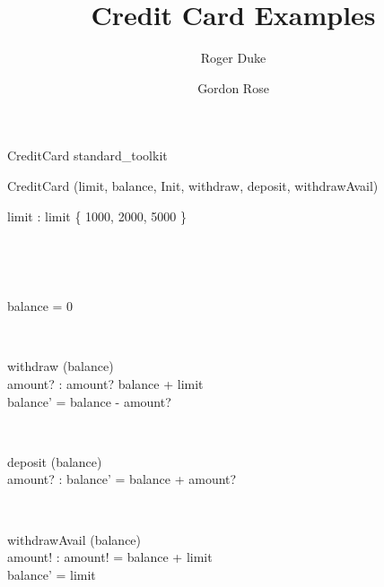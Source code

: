 


\title{Credit Card Examples}
\author{Roger Duke \and Gordon Rose}
\date{}
\maketitle

\begin{zsection}
  \SECTION CreditCard \parents standard\_toolkit
\end{zsection}

\begin{class}{CreditCard} 
\also
        \visibility (limit, balance, Init, withdraw, deposit, withdrawAvail) \\
        \begin{axdef}
		limit : \nat
	\where
		limit \in \{ 1000, 2000, 5000 \}
	\end{axdef}\\
	 \\
	\begin{init}
		balance = 0
	\end{init} \\
	\begin{op}{withdraw}
		\Delta (balance) \\
		amount? : \nat
	\where
		amount? \leq balance + limit \\
		balance' = balance - amount?
	\end{op} \\
	\begin{op}{deposit}
		\Delta (balance) \\
		amount? : \nat
	\where
		balance' = balance + amount?
	\end{op} \\
	\begin{op}{withdrawAvail}
		\Delta (balance) \\
		amount! : \nat
	\where
		amount! = balance + limit \\
		balance' = \negate limit
	\end{op}	
\end{class}

